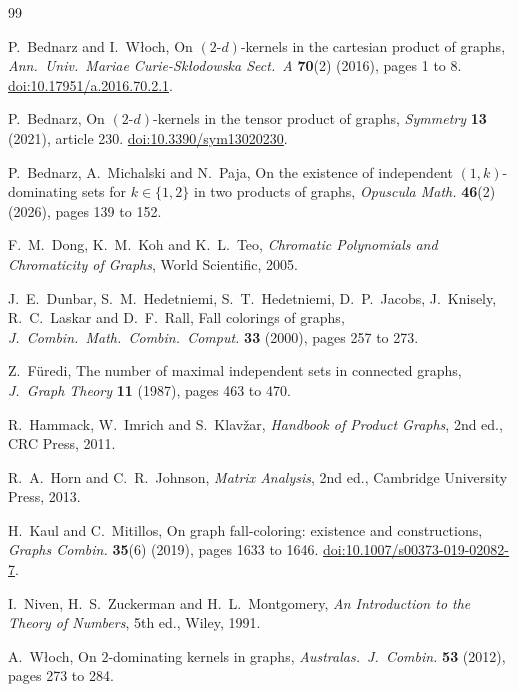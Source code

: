 \documentclass[11pt]{article}
\theoremstyle{plain}
\theoremstyle{definition}
\theoremstyle{remark}
\begin{document}
\begin{thebibliography}{99}

P.~Bednarz and I.~W{\l}och,
On $(2\text{-}d)$-kernels in the cartesian product of graphs,
\emph{Ann.\ Univ.\ Mariae Curie-Sk{\l}odowska Sect.\ A} \textbf{70}(2) (2016), pages 1 to 8.
\href{https://doi.org/10.17951/a.2016.70.2.1}{doi:10.17951/a.2016.70.2.1}.

P.~Bednarz,
On $(2\text{-}d)$-kernels in the tensor product of graphs,
\emph{Symmetry} \textbf{13} (2021), article 230.
\href{https://doi.org/10.3390/sym13020230}{doi:10.3390/sym13020230}.

P.~Bednarz, A.~Michalski and N.~Paja,
On the existence of independent $(1,k)$-dominating sets for $k \in \{1,2\}$ in two products
of graphs,
\emph{Opuscula Math.} \textbf{46}(2) (2026), pages 139 to 152.

F.~M.~Dong, K.~M.~Koh and K.~L.~Teo,
\emph{Chromatic Polynomials and Chromaticity of Graphs}, World Scientific, 2005.

J.~E.~Dunbar, S.~M.~Hedetniemi, S.~T.~Hedetniemi, D.~P.~Jacobs, J.~Knisely, R.~C.~Laskar and
D.~F.~Rall,
Fall colorings of graphs,
\emph{J.\ Combin.\ Math.\ Combin.\ Comput.} \textbf{33} (2000), pages 257 to 273.

Z.~F\"uredi,
The number of maximal independent sets in connected graphs,
\emph{J.\ Graph Theory} \textbf{11} (1987), pages 463 to 470.

R.~Hammack, W.~Imrich and S.~Klav\v{z}ar,
\emph{Handbook of Product Graphs}, 2nd ed., CRC Press, 2011.

R.~A.~Horn and C.~R.~Johnson,
\emph{Matrix Analysis}, 2nd ed., Cambridge University Press, 2013.

H.~Kaul and C.~Mitillos,
On graph fall-coloring: existence and constructions,
\emph{Graphs Combin.} \textbf{35}(6) (2019), pages 1633 to 1646.
\href{https://doi.org/10.1007/s00373-019-02082-7}{doi:10.1007/s00373-019-02082-7}.

I.~Niven, H.~S.~Zuckerman and H.~L.~Montgomery,
\emph{An Introduction to the Theory of Numbers}, 5th ed., Wiley, 1991.

A.~W{\l}och,
On $2$-dominating kernels in graphs,
\emph{Australas.\ J.\ Combin.} \textbf{53} (2012), pages 273 to 284.

\end{thebibliography}
\end{document}
